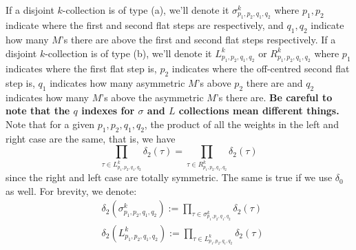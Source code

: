 \documentclass[11pt]{article}
\theoremstyle{definition}
\theoremstyle{definition}
\theoremstyle{plain}
\theoremstyle{plain}
\theoremstyle{plain}
\theoremstyle{definition}
\begin{document}
If a disjoint $k$-collection is of type (a), we'll denote it $\sigma^k_{p_1,p_2,q_1,q_2}$ where $p_1,p_2$ indicate where the first and second flat steps are respectively, and $q_1,q_2$ indicate how many $M$'s there are above the first and second flat steps respectively. If a disjoint $k$-collection is of type (b), we'll denote it $L^k_{p_1,p_2,q_1,q_2}$ or $R^k_{p_1,p_2,q_1,q_2}$ where $p_1$ indicates where the first flat step is, $p_2$ indicates where the off-centred second flat step is, $q_1$ indicates how many asymmetric $M$'s above $p_2$ there are and $q_2$ indicates how many $M$'s above the asymmetric $M$'s there are. \textbf{Be careful to note that the $q$ indexes for $\sigma$ and $L$ collections mean different things.} Note that for a given $p_1,p_2,q_1,q_2$, the product of all the weights in the left and right case are the same, that is, we have
\begin{equation*}
\prod\limits_{\tau\in L^k_{p_1,p_2,q_1,q_2}}\delta_2(\tau) = \prod\limits_{\tau\in R^k_{p_1,p_2,q_1,q_2}}\delta_2(\tau)
\end{equation*}
since the right and left case are totally symmetric. The same is true if we use $\delta_0$ as well. For brevity, we denote:
\begin{align*}
&\delta_2\left(\sigma^k_{p_1,p_2,q_1,q_2}\right) := \prod\limits_{\tau\in\sigma^k_{p_1,p_2,q_1,q_2}}\delta_2(\tau) \\
&\delta_2\left(L^k_{p_1,p_2,q_1,q_2}\right) := \prod\limits_{\tau\in L^k_{p_1,p_2,q_1,q_2}}\delta_2(\tau)
\end{align*}
\end{document}
